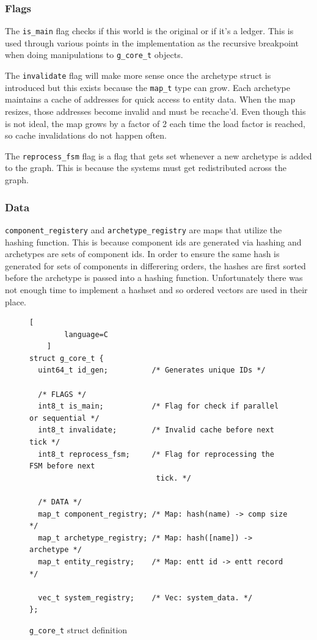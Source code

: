 \subsubsection{Flags}
The \texttt{is\_main} flag checks if this world is the original or if it's a ledger. This is used through various points in the implementation as the recursive breakpoint when doing manipulations to \texttt{g\_core\_t} objects. 

The \texttt{invalidate} flag will make more sense once the archetype struct is introduced but this exists because the \texttt{map\_t} type can grow. Each archetype maintains a cache of addresses for quick access to entity data. When the map resizes, those addresses become invalid and must be recache'd. Even though this is not ideal, the map grows by a factor of 2 each time the load factor is reached, so cache invalidations do not happen often. 

The \texttt{reprocess\_fsm} flag is a flag that gets set whenever a new archetype is added to the graph. This is because the systems must get redistributed across the graph.

\subsubsection{Data}
\texttt{component\_registery} and \texttt{archetype\_registry} are maps that utilize the hashing function. This is because component ids are generated via hashing and archetypes are sets of component ids. In order to ensure the same hash is generated for sets of components in differering orders, the hashes are first sorted before the archetype is passed into a hashing function. Unfortunately there was not enough time to implement a hashset and so ordered vectors are used in their place.

\begin{figure}[H]
    \begin{lstlisting}[
        language=C
    ]
struct g_core_t {
  uint64_t id_gen;          /* Generates unique IDs */
    
  /* FLAGS */
  int8_t is_main;           /* Flag for check if parallel or sequential */
  int8_t invalidate;        /* Invalid cache before next tick */
  int8_t reprocess_fsm;     /* Flag for reprocessing the FSM before next 
                             tick. */

  /* DATA */
  map_t component_registry; /* Map: hash(name) -> comp size */
  map_t archetype_registry; /* Map: hash([name]) -> archetype */
  map_t entity_registry;    /* Map: entt id -> entt record */
    
  vec_t system_registry;    /* Vec: system_data. */
};
    \end{lstlisting}
    \caption{\texttt{g\_core\_t} struct definition}
    \label{code:g_core_t}
\end{figure}

